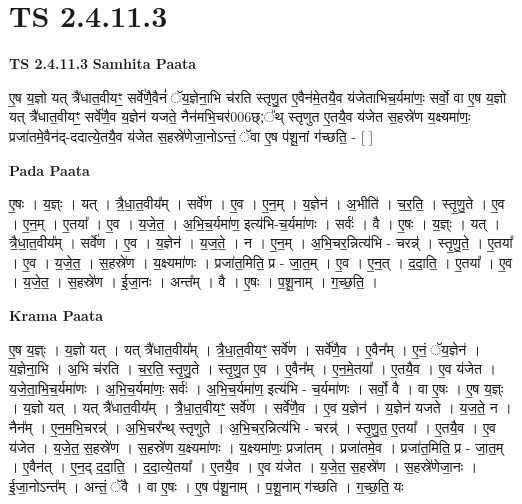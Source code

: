 \documentclass[17pt]{extarticle}
\begin{document}
\section*{ TS 2.4.11.3 }

\textbf{TS 2.4.11.3 } \newline
\textbf{Samhita Paata} \newline

ए॒ष य॒ज्ञो यत् त्रै॑धात॒वीयꣳ॒॒ सर्वे॑णै॒वैनं॑ ॅय॒ज्ञेना॒भि च॑रति स्तृणु॒त ए॒वैन॑मे॒तयै॒व य॑जेताभिच॒र्यमा॑णः॒ सर्वो॒ वा ए॒ष य॒ज्ञो यत् त्रै॑धात॒वीयꣳ॒॒ सर्वे॑णै॒व य॒ज्ञेन॑ यजते॒ नैन॑मभि॒चर॑006छ्;᳚थ् स्तृणुत ए॒तयै॒व य॑जेत स॒हस्रे॑ण य॒क्ष्यमा॑णः॒ प्रजा॑तमे॒वैन॑द्-ददात्ये॒तयै॒व य॑जेत स॒हस्रे॑णेजा॒नोऽन्तं॒ ॅवा ए॒ष प॑शू॒नां ग॑च्छति॒ - [  ] \newline

\textbf{Pada Paata} \newline

ए॒षः । य॒ज्ञ्ः । यत् । त्रै॒धा॒त॒वीय᳚म् ।   सर्वे॑ण । ए॒व । ए॒न॒म् । य॒ज्ञेन॑ । अ॒भीति॑ । च॒र॒ति॒ । स्तृ॒णु॒ते । ए॒व । ए॒न॒म् । ए॒तया᳚ ।   ए॒व । य॒जे॒त॒ । अ॒भि॒च॒र्यमा॑ण॒ इत्य॑भि-च॒र्यमा॑णः । सर्वः॑ । वै । ए॒षः । य॒ज्ञ्ः । यत् । त्रै॒धा॒त॒वीय᳚म् । सर्वे॑ण । ए॒व । य॒ज्ञेन॑ । य॒ज॒ते॒ । न । ए॒न॒म् । अ॒भि॒चर॒न्नित्य॑भि - चरन्न्॑ । स्तृ॒णु॒ते॒ । ए॒तया᳚ । ए॒व । य॒जे॒त॒ । स॒हस्रे॑ण । य॒क्ष्यमा॑णः । प्रजा॑त॒मिति॒ प्र - जा॒त॒म् । ए॒व । ए॒न॒त् । द॒दा॒ति॒ । ए॒तया᳚ । ए॒व । य॒जे॒त॒ । स॒हस्रे॑ण । ई॒जा॒नः । अन्त᳚म् । वै । ए॒षः । प॒शू॒नाम् । ग॒च्छ॒ति॒ ।  \newline


\textbf{Krama Paata} \newline

ए॒ष य॒ज्ञ्ः । य॒ज्ञो यत् । यत् त्रै॑धात॒वीय᳚म् । त्रै॒धा॒त॒वीयꣳ॒॒ सर्वे॑ण । सर्वे॑णै॒व । ए॒वैन᳚म् । ए॒नं॒ ॅय॒ज्ञेन॑ । य॒ज्ञेना॒भि । अ॒भि च॑रति । च॒र॒ति॒ स्तृ॒णु॒ते । स्तृ॒णु॒त ए॒व । ए॒वैन᳚म् । ए॒न॒मे॒तया᳚ । ए॒तयै॒व । ए॒व य॑जेत । य॒जे॒ता॒भि॒च॒र्यमा॑णः । अ॒भि॒च॒र्यमा॑णः॒ सर्वः॑ । अ॒भि॒च॒र्यमा॑ण॒ इत्य॑भि - च॒र्यमा॑णः । सर्वो॒ वै । वा ए॒षः । ए॒ष य॒ज्ञ्ः । य॒ज्ञो यत् । यत् त्रै॑धात॒वीय᳚म् । त्रै॒धा॒त॒वीयꣳ॒॒ सर्वे॑ण । सर्वे॑णै॒व । ए॒व य॒ज्ञेन॑ । य॒ज्ञेन॑ यजते । य॒ज॒ते॒ न । नैन᳚म् । ए॒न॒म॒भि॒चरन्न्॑ । अ॒भि॒चर᳚न्थ् स्तृणुते । अ॒भि॒चर॒न्नित्य॑भि - चरन्न्॑ । स्तृ॒णु॒त॒ ए॒तया᳚ । ए॒तयै॒व । ए॒व य॑जेत । य॒जे॒त॒ स॒हस्रे॑ण । स॒हस्रे॑ण य॒क्ष्यमा॑णः । य॒क्ष्यमा॑णः॒ प्रजा॑तम् । प्रजा॑तमे॒व । प्रजा॑त॒मिति॒ प्र - जा॒त॒म् । ए॒वैन॑त् । ए॒न॒द् द॒दा॒ति॒ । द॒दा॒त्ये॒तया᳚ । ए॒तयै॒व । ए॒व य॑जेत । य॒जे॒त॒ स॒हस्रे॑ण । स॒हस्रे॑णेजा॒नः । ई॒जा॒नोऽन्त᳚म् । अन्तं॒ ॅवै । वा ए॒षः । ए॒ष प॑शू॒नाम् । प॒शू॒नाम् ग॑च्छति । ग॒च्छ॒ति॒ यः \newline
\end{document}
